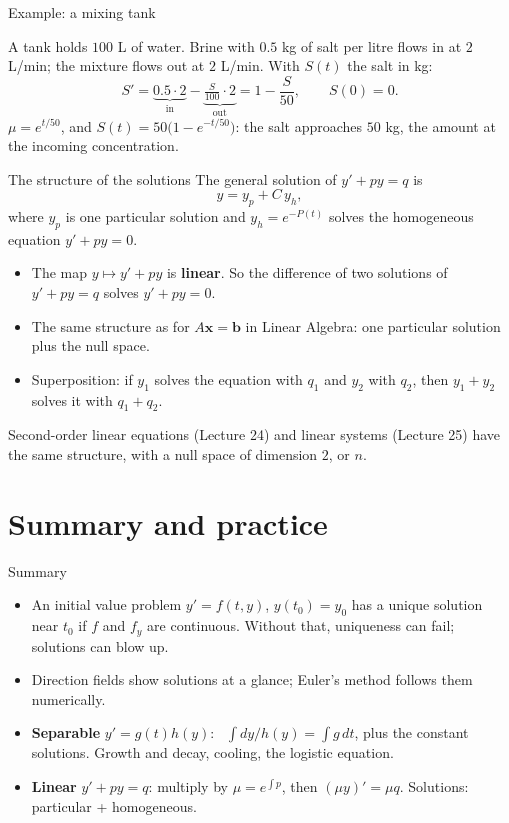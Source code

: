 \documentclass[10pt]{wosm-slides}
\begin{document}
\begin{frame}{Example: a mixing tank}
  \begin{example}
    A tank holds $100$ L of water. Brine with $0.5$ kg of salt per litre flows in at $2$ L/min; the
    mixture flows out at $2$ L/min. With $S(t)$ the salt in kg:
    \[ S' = \underbrace{0.5 \cdot 2}_{\text{in}} - \underbrace{\tfrac{S}{100} \cdot 2}_{\text{out}}
       = 1 - \frac{S}{50}, \qquad S(0) = 0 . \]
    \pause
    $\mu = e^{t/50}$, and $S(t) = 50\bigl(1 - e^{-t/50}\bigr)$: the salt approaches $50$ kg, the amount at
    the incoming concentration.
  \end{example}
\end{frame}

\begin{frame}{The structure of the solutions}
  The general solution of $y' + p y = q$ is
  \[ y = y_p + C\, y_h , \]
  where $y_p$ is one particular solution and $y_h = e^{-P(t)}$ solves the homogeneous equation
  $y' + py = 0$.
  \pause
  \begin{itemize}
    \item The map $y \mapsto y' + py$ is \textbf{linear}. So the difference of two solutions of
      $y' + py = q$ solves $y' + py = 0$.
    \item The same structure as for $A\mathbf x = \mathbf b$ in Linear Algebra: one particular solution
      plus the null space.
    \item Superposition: if $y_1$ solves the equation with $q_1$ and $y_2$ with $q_2$, then $y_1 + y_2$
      solves it with $q_1 + q_2$.
  \end{itemize}
  \pause
  {\small Second-order linear equations (Lecture 24) and linear systems (Lecture 25) have the same
  structure, with a null space of dimension $2$, or $n$.\par}
\end{frame}

\section{Summary and practice}

\begin{frame}{Summary}
  \begin{itemize}
    \item An initial value problem $y' = f(t, y)$, $y(t_0) = y_0$ has a unique solution near $t_0$ if $f$
      and $f_y$ are continuous. Without that, uniqueness can fail; solutions can blow up.
    \item Direction fields show solutions at a glance; Euler's method follows them numerically.
    \item \textbf{Separable} $y' = g(t)h(y)$: \ $\int dy/h(y) = \int g\, dt$, plus the constant solutions.
      Growth and decay, cooling, the logistic equation.
    \item \textbf{Linear} $y' + py = q$: multiply by $\mu = e^{\int p}$, then $(\mu y)' = \mu q$.
      Solutions: particular + homogeneous.
  \end{itemize}
\end{frame}
\end{document}
